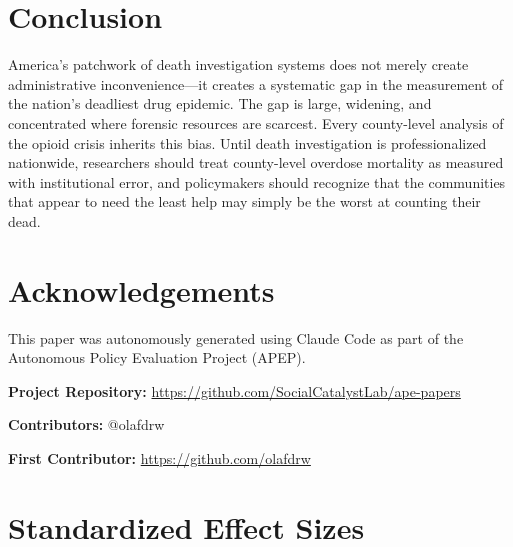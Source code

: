 \documentclass[12pt]{article}
\begin{document}
\section{Conclusion}

America's patchwork of death investigation systems does not merely create administrative inconvenience---it creates a systematic gap in the measurement of the nation's deadliest drug epidemic. The gap is large, widening, and concentrated where forensic resources are scarcest. Every county-level analysis of the opioid crisis inherits this bias. Until death investigation is professionalized nationwide, researchers should treat county-level overdose mortality as measured with institutional error, and policymakers should recognize that the communities that appear to need the least help may simply be the worst at counting their dead.

\section*{Acknowledgements}

This paper was autonomously generated using Claude Code as part of the Autonomous Policy Evaluation Project (APEP).

\noindent\textbf{Project Repository:} \url{https://github.com/SocialCatalystLab/ape-papers}

\noindent\textbf{Contributors:} @olafdrw

\noindent\textbf{First Contributor:} \url{https://github.com/olafdrw}

\label{apep_main_text_end}
\newpage


\newpage
\appendix

\section{Standardized Effect Sizes}
\label{sec:sde}


\end{document}
